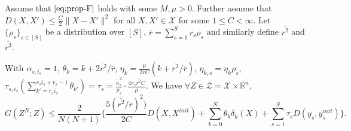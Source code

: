 \documentclass[10pt,a4paper]{amsart}
\newcommand{\R}{\mathbb{R}}
\newcommand{\mc}{\mathcal}
\begin{document}
\begin{theorem}\label{thm:acc_convergence}
Assume that $\eqref{eq:prop-F}$ holds with some $M,\mu>0$. Further assume that $D(X,X')\leq \frac{C}{2}\|X-X'\|^2$ for all $X,X'\in \mc X$ for some $1\leq C<\infty$. Let $\{\rho_s\}_{s\in [S]}$ be a distribution over $[S]$, $\overline{r} = \sum_{s=1}^S r_s\rho_s$ and similarly define $\overline{r^2}$ and $\overline{r^3}$. 
    
    With $\alpha_{s,i_s} = 1$, $\theta_k = k+ 2\overline{r^2}/\overline{r}$, $\eta_k = \frac{\mu }{2\overline{r}C}(k+\overline{r^2}/\overline{r})$, $\eta_{k,s} = \eta_k\rho_s$, $\tau_{s,i_s}(\sum_{k'=r_si_s}^{r_si_s+r_s-1}\theta_{k'}) = \tau_s= \frac{\widetilde{\kappa}_s^2}{\rho_s}\cdot\frac{4r_s\overline{r^2}C}{\mu}$. We have $\forall Z\in \mc Z=\mc X\times \R^n$, 
\begin{equation*}
     G(Z^N;Z) \leq \frac{2}{N(N+1)}\biggl\{\frac{5(\overline{r^2}/\overline{r})^2)}{2C}D(X,X^{init})+\sum_{k=0}^N\theta_k\delta_k(X)+ \sum_{s=1}^S\tau_{s}D(y_s,y_s^{init})  \biggr\}.
\end{equation*}


\end{theorem}
\end{document}
